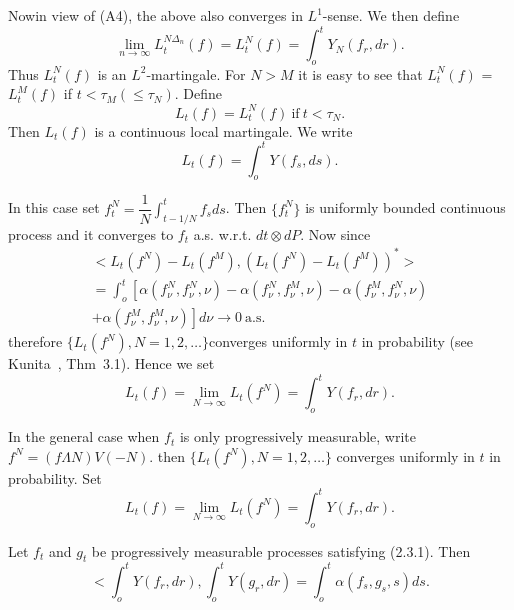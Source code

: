 Now\pageoriginale in view of (A4), the above also converges in $L^1$-sense. We
 then define  
 \begin{equation*}
   \lim_{n \to \infty}L^{N \Delta_n}_t (f)=L^N_t (f)=\int^t_o
   Y_N(f_r,dr).\tag{2.3.4}\label{c2:eq2.3.4} 
 \end{equation*} 
 Thus $L^N_t(f)$ is an $L^2$-martingale. For $N>M$ it is easy to see
 that $L^N_t(f)$ = $L^M_t(f)$ if $t < \tau_M(\leq \tau_N)$. Define 
 \begin{equation*}
   L_t(f)=L^N_t(f) ~\text{if}~ t<\tau_N. \tag{2.3.5}\label{c2:eq2.3.5}
 \end{equation*} 
 Then $L_t(f)$ is a continuous local martingale. We write
 $$
 L_t(f)=\int^t_o Y(f_s,ds).
 $$

\medskip
{}

 In this case set $f^N_t = \dfrac{1}{N}\int^t_{t-1/N} f_s ds$. Then
 $\{f^N_t\}$ is uniformly bounded continuous process and it converges
 to $f_t$ a.s. w.r.t. $dt \otimes dP$. Now since 
 \begin{multline*}
   < L_t\left(f^N\right)-L_t\left(f^M\right),
   \left(L_t\left(f^N\right)  -L_t\left(f^M\right)\right)^*>\\ 
   =\int^t_o \left[\alpha\left(f^N_\nu,f^N_\nu,\nu\right) 
     -\alpha\left(f^N_\nu,f^M_\nu,\nu\right)
     -\alpha\left(f^M_\nu,f^N_\nu,\nu\right) \right.\\  
      \left.+\alpha\left(f^M_\nu,f^M_\nu,\nu\right)\right]d \nu \to 0
   ~\text{a.s.} 
 \end{multline*}
 therefore $\{L_t (f^N),N=1,2,\ldots\}$converges uniformly in $t$ in
 probability (see Kunita~\cite{18}, Thm~3.1). Hence we set 
 $$
 L_t(f)=\lim_{N \to \infty}L_t\left(f^N\right)=\int^t_o
 Y\left(f_r,dr\right). 
 $$

\smallskip 
{}

   In the general case when $f_t$ is only progressively measurable,
   write $f^N=(f \Lambda N)V(-N)$. then $\{L_t(f^N),N=1,2,\ldots\}$
   converges uniformly in $t$ in probability. Set 
   $$
   L_t(f)= \lim_{N \to \infty}L_t(f^N) = \int^t_o Y(f_r,dr).
   $$
 

 \begin{proposition}\label{c2:prop2.3.1}\pageoriginale%
   Let $f_t$ and $g_t$ be progressively measurable processes
   satisfying (2.3.1). Then 
   \begin{equation*} 
     < \int^t_o Y(f_r,dr),\int^t_o Y(g_r,dr)=\int^t_o
     \alpha(f_s,g_s,s)ds. \tag{2.3.6}\label{c2:eq2.3.6} 
   \end{equation*}
 \end{proposition} 
 

